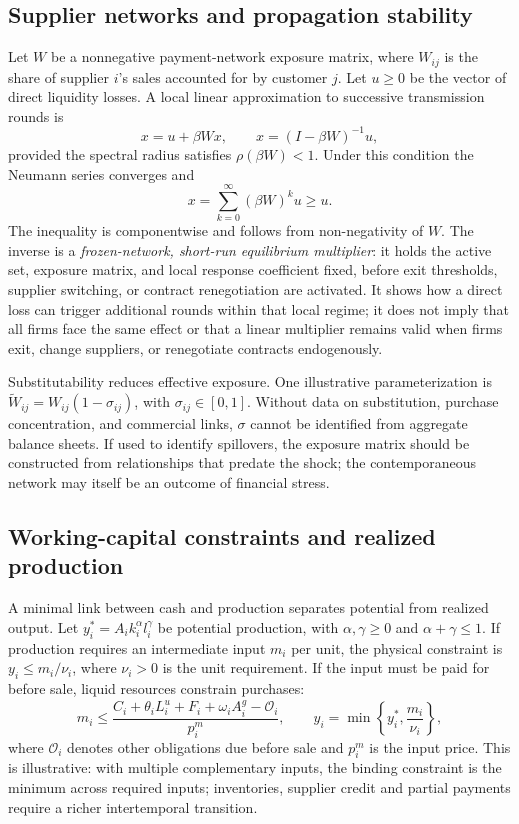 \documentclass[11pt,a4paper]{article}
\begin{document}
\subsection{Supplier networks and propagation stability}
Let $W$ be a nonnegative payment-network exposure matrix, where $W_{ij}$ is the share of supplier $i$’s sales accounted for by customer $j$. Let $u\geq0$ be the vector of direct liquidity losses. A local linear approximation to successive transmission rounds is
\begin{equation}
x=u+\beta Wx,\qquad x=(I-\beta W)^{-1}u, \label{eq:network}
\end{equation}
provided the spectral radius satisfies $\rho(\beta W)<1$. Under this condition the Neumann series converges and
\begin{equation}
x=\sum_{k=0}^{\infty}(\beta W)^ku\geq u. \label{eq:neumann}
\end{equation}
The inequality is componentwise and follows from non-negativity of $W$. The inverse is a \emph{frozen-network, short-run equilibrium multiplier}: it holds the active set, exposure matrix, and local response coefficient fixed, before exit thresholds, supplier switching, or contract renegotiation are activated. It shows how a direct loss can trigger additional rounds within that local regime; it does not imply that all firms face the same effect or that a linear multiplier remains valid when firms exit, change suppliers, or renegotiate contracts endogenously.

Substitutability reduces effective exposure. One illustrative parameterization is $\widetilde W_{ij}=W_{ij}(1-\sigma_{ij})$, with $\sigma_{ij}\in[0,1]$. Without data on substitution, purchase concentration, and commercial links, $\sigma$ cannot be identified from aggregate balance sheets. If used to identify spillovers, the exposure matrix should be constructed from relationships that predate the shock; the contemporaneous network may itself be an outcome of financial stress.

\subsection{Working-capital constraints and realized production}
A minimal link between cash and production separates potential from realized output. Let $y_i^*=A_i k_i^{\alpha}l_i^{\gamma}$ be potential production, with $\alpha,\gamma\geq0$ and $\alpha+\gamma\leq1$. If production requires an intermediate input $m_i$ per unit, the physical constraint is $y_i\leq m_i/\nu_i$, where $\nu_i>0$ is the unit requirement. If the input must be paid for before sale, liquid resources constrain purchases:
\begin{equation}
 m_i\leq \frac{C_i+\theta_iL_i^u+F_i+\omega_iA_i^g-\mathcal O_i}{p_i^m},\qquad
 y_i=\min\left\{y_i^*,\frac{m_i}{\nu_i}\right\},
\label{eq:working_capital_prod}
\end{equation}
where $\mathcal O_i$ denotes other obligations due before sale and $p_i^m$ is the input price. This is illustrative: with multiple complementary inputs, the binding constraint is the minimum across required inputs; inventories, supplier credit and partial payments require a richer intertemporal transition.
\end{document}
